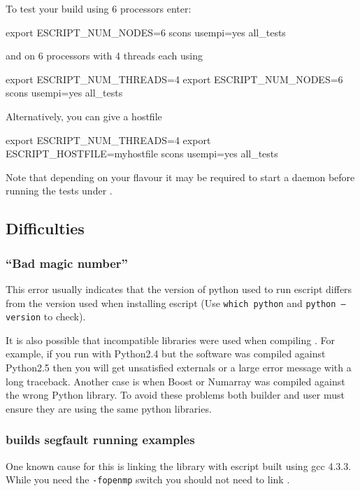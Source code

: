 To test your build using 6 processors enter:
\begin{shellCode}
export ESCRIPT_NUM_NODES=6
scons usempi=yes all_tests
\end{shellCode}
and on 6 processors with 4 threads each using 
\begin{shellCode}
export ESCRIPT_NUM_THREADS=4
export ESCRIPT_NUM_NODES=6
scons usempi=yes all_tests
\end{shellCode}
Alternatively, you can give a hostfile
\begin{shellCode}
export ESCRIPT_NUM_THREADS=4
export ESCRIPT_HOSTFILE=myhostfile
scons usempi=yes all_tests
\end{shellCode}
Note that depending on your \mpi flavour it may be required to start a daemon before running the tests under \mpi.


\subsection{Difficulties}

\subsubsection{``Bad magic number''}
This error usually indicates that the version of python used to run escript differs from the version used when installing escript (Use \texttt{which python} and \texttt{python --version} to check).

It is also possible that incompatible libraries were used when compiling \esfinley.
For example, if you run with Python2.4 but the software was compiled against Python2.5 then you will get unsatisfied externals or a large error message with a long traceback.
Another case is when Boost or Numarray was compiled against the wrong Python library.
To avoid these problems both builder and user must ensure they are using the same python libraries.

\subsubsection{\openmp builds segfault running examples}

One known cause for this is linking the  library with escript built using gcc 4.3.3.
While you need the \texttt{-fopenmp} switch you should not need to link .

